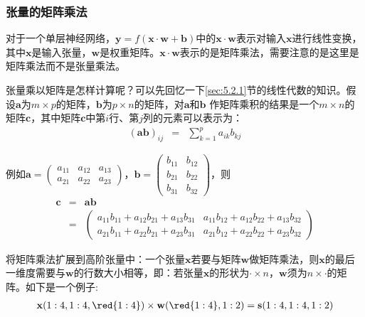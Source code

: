 \subsubsection{张量的矩阵乘法}

\parinterval 对于一个单层神经网络，$ \mathbf y=f(\mathbf x\cdot \mathbf w+\mathbf b) $中的$ \mathbf x\cdot \mathbf w $表示对输入$ \mathbf x $进行线性变换，其中$ \mathbf x $是输入张量，$ \mathbf w $是权重矩阵。$ \mathbf x\cdot \mathbf w $表示的是矩阵乘法，需要注意的是这里是矩阵乘法而不是张量乘法。

\parinterval 张量乘以矩阵是怎样计算呢？可以先回忆一下\ref{sec:5.2.1}节的线性代数的知识。假设$ \mathbf a $为$ m\times p $的矩阵，$ \mathbf b $为$ p\times n $的矩阵，对$ \mathbf a $和$ \mathbf b $ 作矩阵乘积的结果是一个$ m\times n $的矩阵$ \mathbf c $，其中矩阵$ \mathbf c $中第$ i $行、第$ j $列的元素可以表示为：
\begin{eqnarray}
{(\mathbf a\mathbf b)}_{ij}&=&\sum_{k=1}^{p}{a_{ik}b_{kj}}
\label{eq:5-24}
\end{eqnarray}

\noindent 例如$ \mathbf a= \begin{pmatrix} a_{11} & a_{12} & a_{13}\\a_{21} & a_{22} & a_{23}\end{pmatrix} $，$ \mathbf b= \begin{pmatrix} b_{11} & b_{12}\\b_{21} & b_{22}\\b_{31} & b_{32}\end{pmatrix} $，则
\begin{eqnarray}
\mathbf c & = & \mathbf a\mathbf b \nonumber \\
                & = & \begin{pmatrix} a_{11}b_{11}+a_{12}b_{21}+a_{13}b_{31} & a_{11}b_{12}+a_{12}b_{22}+a_{13}b_{32}\\a_{21}b_{11}+a_{22}b_{21}+a_{23}b_{31} & a_{21}b_{12}+a_{22}b_{22}+a_{23}b_{32}\end{pmatrix}
\label{}
\end{eqnarray}

\parinterval 将矩阵乘法扩展到高阶张量中：一个张量$ \mathbf x $若要与矩阵$ \mathbf w $做矩阵乘法，则$ \mathbf x $的最后一维度需要与$ \mathbf w $的行数大小相等，即：若张量$ \mathbf x $的形状为$ \cdot \times n $，$ \mathbf w $须为$ n\times \cdot $的矩阵。如下是一个例子:
\begin{eqnarray}
\mathbf x(1:4,1:4,{\red{1:4}})\times {\mathbf w({\red{1:4}},1:2)}=\mathbf s(1:4,1:4,1:2)
\label{eq:5-25}
\end{eqnarray}


